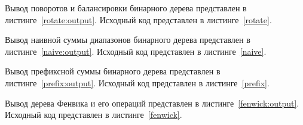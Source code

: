 


Вывод поворотов и балансировки бинарного дерева представлен в листинге~\ref{rotate:output}. 
Исходный код представлен в листинге~\ref{rotate}.







Вывод наивной суммы диапазонов бинарного дерева представлен в листинге~\ref{naive:output}. 
Исходный код представлен в листинге~\ref{naive}.






Вывод префиксной суммы бинарного дерева представлен в листинге~\ref{prefix:output}. 
Исходный код представлен в листинге~\ref{prefix}.







Вывод дерева Фенвика и его операций представлен в листинге~\ref{fenwick:output}. 
Исходный код представлен в листинге~\ref{fenwick}.



